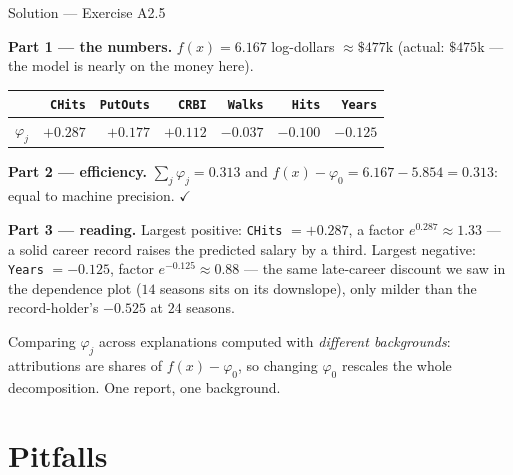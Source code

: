 \documentclass[aspectratio=169,11pt]{beamer}
\begin{document}
\begin{frame}{Solution --- Exercise A2.5}
\begin{solutionbox}
  \textbf{Part 1 --- the numbers.} $f(x) = 6.167$ log-dollars $\approx \$477$k
  (actual: $\$475$k --- the model is nearly on the money here).
  \begin{center}
  \begin{tabular}{@{}lrrrrrr@{}}
    \toprule
    & \texttt{CHits} & \texttt{PutOuts} & \texttt{CRBI} & \texttt{Walks} & \texttt{Hits} & \texttt{Years} \\
    \midrule
    $\varphi_j$ & $+0.287$ & $+0.177$ & $+0.112$ & $-0.037$ & $-0.100$ & $-0.125$ \\
    \bottomrule
  \end{tabular}
  \end{center}
  \textbf{Part 2 --- efficiency.} $\sum_j\varphi_j = 0.313$ and
  $f(x)-\varphi_0 = 6.167-5.854 = 0.313$: equal to machine precision. $\checkmark$

  \smallskip
  \textbf{Part 3 --- reading.} Largest positive: \texttt{CHits} $=+0.287$, a factor
  $e^{0.287}\approx 1.33$ --- a solid career record raises the predicted salary by a
  third. Largest negative: \texttt{Years} $=-0.125$, factor $e^{-0.125}\approx0.88$
  --- the same late-career discount we saw in the dependence plot ($14$ seasons sits
  on its downslope), only milder than the record-holder's $-0.525$ at $24$ seasons.
\end{solutionbox}
\begin{mistake}
  Comparing $\varphi_j$ across explanations computed with \emph{different
  backgrounds}: attributions are shares of $f(x)-\varphi_0$, so changing $\varphi_0$
  rescales the whole decomposition. One report, one background.
\end{mistake}
\end{frame}

\section{Pitfalls}
\end{document}
